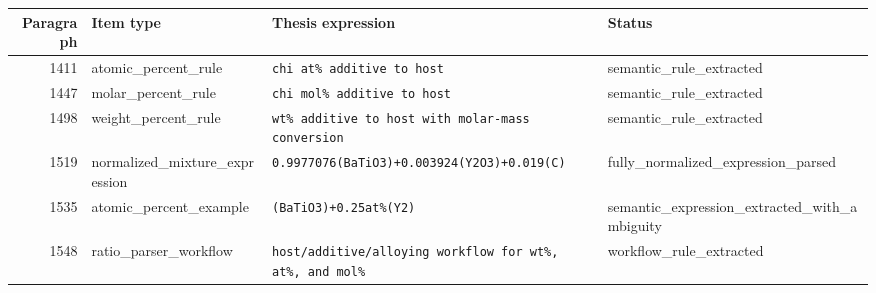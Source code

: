 \begin{tabular}{@{}rlp{5.5cm}l@{}}
\toprule
Paragraph & Item type & Thesis expression & Status \\
\midrule
1411 & atomic\_percent\_rule & \texttt{chi at\% additive to host} & semantic\_rule\_extracted \\
1447 & molar\_percent\_rule & \texttt{chi mol\% additive to host} & semantic\_rule\_extracted \\
1498 & weight\_percent\_rule & \texttt{wt\% additive to host with molar-mass conversion} & semantic\_rule\_extracted \\
1519 & normalized\_mixture\_expression & \texttt{0.9977076(BaTiO3)+0.003924(Y2O3)+0.019(C)} & fully\_normalized\_expression\_parsed \\
1535 & atomic\_percent\_example & \texttt{(BaTiO3)+0.25at\%(Y2)} & semantic\_expression\_extracted\_with\_ambiguity \\
1548 & ratio\_parser\_workflow & \texttt{host/additive/alloying workflow for wt\%, at\%, and mol\%} & workflow\_rule\_extracted \\
\bottomrule
\end{tabular}
